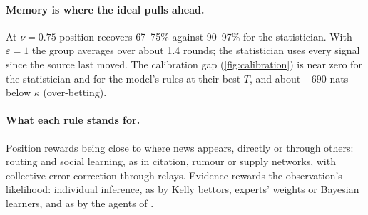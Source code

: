 \paragraph{Memory is where the ideal pulls ahead.} At $\nu=0.75$ position recovers 67--75\% against 90--97\% for the
statistician. With $\varepsilon=1$ the group averages over about 1.4 rounds; the statistician uses every signal since the
source last moved. The calibration gap (\cref{fig:calibration}) is near zero for the statistician and for the model's
rules at their best $T$, and about $-690$ nats below $\kappa$ (over-betting).


\begin{table}[tbp]\centering\small
\caption{Each reward rule at its best commitment (E9).}\label{tab:e9}

\end{table}

\paragraph{What each rule stands for.} Position rewards being close to where news appears, directly or through others:
routing and social learning, as in citation, rumour or supply networks, with collective error correction through relays.
Evidence rewards the observation's likelihood: individual inference, as by Kelly bettors, experts' weights or Bayesian
learners, and as by the agents of \citet{lee2024constructing}.

